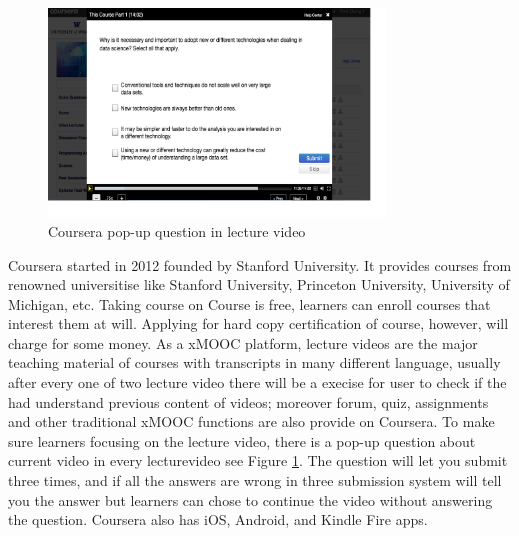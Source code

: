 \begin{figure}[H]
    \centering
    \includegraphics[width = 0.8\textwidth]{fig/coursera_pop.eps}
    \caption{Coursera pop-up question in lecture video}
    \label{fig:coursera_pop}
\end{figure}

Coursera \cite{coursera} started in 2012 founded by Stanford University. It provides courses from renowned universitise like Stanford University,  Princeton University, University of Michigan, etc.
Taking course on Course is free, learners can enroll courses that interest them at will.
Applying for hard copy certification of course, however, will charge for some money.
As a xMOOC platform, lecture videos are the major teaching material of courses with transcripts in many different language, usually after every one of two lecture video there will be a execise for user to check if the had understand previous content of videos; moreover forum, quiz, assignments and other traditional xMOOC functions are also provide on Coursera.
To make sure learners focusing on the lecture video, there is a pop-up question about current video in every lecturevideo see Figure \ref{fig:coursera_pop}.
The question will let you submit three times, and if all the answers are wrong in three submission system will tell you the answer but learners can chose to continue the video without answering the question.
Coursera also has iOS, Android, and Kindle Fire apps.

